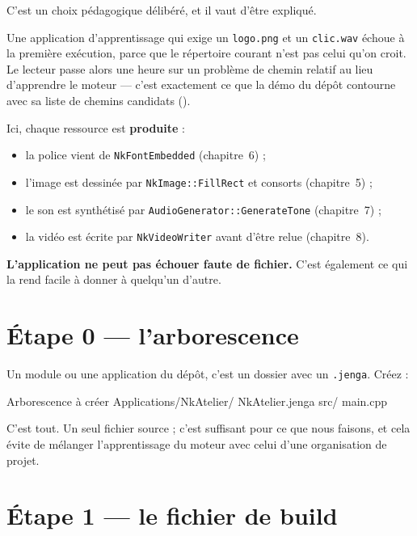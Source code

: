 \begin{nkretenir}
C'est un choix pédagogique délibéré, et il vaut d'être expliqué.

Une application d'apprentissage qui exige un \texttt{logo.png} et un
\texttt{clic.wav} échoue à la première exécution, parce que le répertoire
courant n'est pas celui qu'on croit. Le lecteur passe alors une heure sur un
problème de chemin relatif au lieu d'apprendre le moteur — c'est exactement ce
que la démo du dépôt contourne avec sa liste de chemins candidats
().

Ici, chaque ressource est \textbf{produite} :
\begin{itemize}
  \item la police vient de \texttt{NkFontEmbedded} (chapitre~6) ;
  \item l'image est dessinée par \texttt{NkImage::FillRect} et consorts
        (chapitre~5) ;
  \item le son est synthétisé par \texttt{AudioGenerator::GenerateTone}
        (chapitre~7) ;
  \item la vidéo est écrite par \texttt{NkVideoWriter} avant d'être relue
        (chapitre~8).
\end{itemize}
\textbf{L'application ne peut pas échouer faute de fichier.} C'est également ce
qui la rend facile à donner à quelqu'un d'autre.
\end{nkretenir}

\section{Étape 0 — l'arborescence}

Un module ou une application du dépôt, c'est un dossier avec un
\texttt{.jenga}. Créez :

\begin{nkcode}{Arborescence à créer}
Applications/NkAtelier/
  NkAtelier.jenga
  src/
    main.cpp
\end{nkcode}

C'est tout. Un seul fichier source ; c'est suffisant pour ce que nous faisons, et
cela évite de mélanger l'apprentissage du moteur avec celui d'une organisation
de projet.

\section{Étape 1 — le fichier de build}

